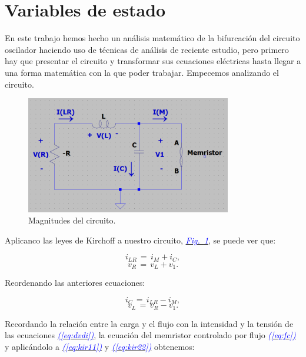 \documentclass[12pt,a4paper]{report} %
\newcommand{\fref}[1]{\hyperref[#1]{\textcolor{blue}{\textit{Fig.~\ref*{#1}}}}}
\newcommand{\eref}[1]{\hyperref[#1]{\textcolor{blue}{\textit{(\ref*{#1})}}}}
\begin{document}
	\newpage
	
	\section{Variables de estado}
	\noindent En este trabajo hemos hecho un análisis matemático de la bifurcación del circuito oscilador haciendo uso de técnicas de análisis de reciente estudio, pero primero hay que presentar el circuito y transformar sus ecuaciones eléctricas hasta llegar a una forma matemática con la que poder trabajar. Empecemos analizando el circuito.
	
	\begin{figure}[h]
		\centering
		\includegraphics[width=0.8\textwidth]{circuito.png}
		\caption{Magnitudes del circuito.}
		\label{fig:circuito}
	\end{figure}\smallskip
	
	Aplicanco las leyes de Kirchoff a nuestro circuito, \fref{fig:circuito}, se puede ver que:
	
	\begin{equation}
		i_{LR}\,=\,i_M+i_C,
		\label{eq:kir1}
	\end{equation}
	\begin{equation}
		v_R\,=\,v_L+v_1.
		\label{eq:kir2}
	\end{equation}
	
	Reordenando las anteriores ecuaciones:
	
	\begin{equation}
		i_C\,=\,i_{LR}-i_M,
		\label{eq:kir11}
	\end{equation}
	\begin{equation}
		v_L\,=\,v_R-v_1.
		\label{eq:kir22}
	\end{equation}
	
	Recordando la relación entre la carga y el flujo con la intensidad y la tensión de las ecuaciones \eref{eq:dvdi}, la ecuación del memristor controlado por flujo \eref{eq:fc} y aplicándolo a \eref{eq:kir11} y \eref{eq:kir22} obtenemos:
	
\end{document}
